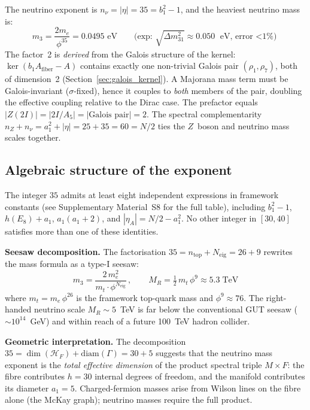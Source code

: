 \documentclass[12pt,a4paper]{article}
\theoremstyle{definition}
\begin{document}
The neutrino exponent is $n_\nu = |\eta| = 35 = b_1^2 - 1$, and the heaviest neutrino mass is:
\begin{equation}
\boxed{m_3 = \frac{2m_e}{\phi^{35}} = 0.0495 \text{ eV}} \qquad \text{(exp: } \sqrt{\Delta m^2_{31}} \approx 0.050 \text{ eV, error $<$1\%)}
\end{equation}
The factor~2 is \emph{derived} from the Galois structure of the kernel: $\ker(b_1 A_{\text{fiber}} - A)$ contains exactly one non-trivial Galois pair $(\rho_1, \rho_7)$, both of dimension~2 (Section~\ref{sec:galois_kernel}).  A Majorana mass term must be Galois-invariant ($\sigma$-fixed), hence it couples to \emph{both} members of the pair, doubling the effective coupling relative to the Dirac case.  The prefactor equals $|Z(2I)| = |2I/A_5| = |\text{Galois pair}| = 2$.  The spectral complementarity $n_Z + n_\nu = a_1^2 + |\eta| = 25 + 35 = 60 = N/2$ ties the $Z$~boson and neutrino mass scales together.

\subsection{Algebraic structure of the exponent}\label{sec:nu_exponent}

The integer $35$ admits at least eight independent expressions in framework constants (see Supplementary Material~S8 for the full table), including $b_1^2 - 1$, $h(E_8) + a_1$, $a_1(a_1+2)$, and $|\eta_A| = N/2 - a_1^2$.  No other integer in $[30,40]$ satisfies more than one of these identities.

\textbf{Seesaw decomposition.}  The factorisation $35 = n_{\text{top}} + N_{\text{eig}} = 26 + 9$ rewrites the mass formula as a type-I seesaw:
\begin{equation}
m_3 = \frac{2\,m_e^2}{m_t \cdot \phi^{N_{\text{eig}}}} \,,\qquad
M_R = \tfrac{1}{2}\,m_t\,\phi^{9} \approx 5.3\;\text{TeV}
\label{eq:seesaw}
\end{equation}
where $m_t = m_e\,\phi^{26}$ is the framework top-quark mass and $\phi^9 \approx 76$.  The right-handed neutrino scale $M_R \sim 5$~TeV is far below the conventional GUT seesaw ($\sim\!10^{14}$~GeV) and within reach of a future 100~TeV hadron collider.

\textbf{Geometric interpretation.}  The decomposition $35 = \dim(\mathcal{H}_F) + \mathrm{diam}(\Gamma) = 30 + 5$ suggests that the neutrino mass exponent is the \emph{total effective dimension} of the product spectral triple $M \times F$: the fibre contributes $h = 30$ internal degrees of freedom, and the manifold contributes its diameter $a_1 = 5$.  Charged-fermion masses arise from Wilson lines on the fibre alone (the McKay graph); neutrino masses require the full product.
\end{document}
